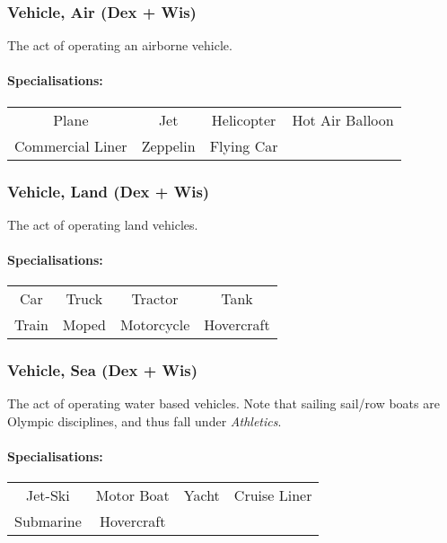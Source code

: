 \subsubsection{Vehicle, Air (Dex + Wis)}
The act of operating an airborne vehicle.

\paragraph{Specialisations:}
\begin{center}
    \begin{tabular}{c|c|c|c}
        Plane & Jet & Helicopter & Hot Air Balloon \\
        Commercial Liner & Zeppelin & Flying Car \\
    \end{tabular}
\end{center}

\subsubsection{Vehicle, Land (Dex + Wis)}
The act of operating land vehicles.

\paragraph{Specialisations:}
\begin{center}
    \begin{tabular}{c|c|c|c}
        Car & Truck & Tractor & Tank \\
        Train & Moped & Motorcycle & Hovercraft
    \end{tabular}
\end{center}

\subsubsection{Vehicle, Sea (Dex + Wis)}
The act of operating water based vehicles.
Note that sailing sail/row boats are Olympic disciplines, and thus fall under \textit{Athletics}.

\paragraph{Specialisations:}
\begin{center}
    \begin{tabular}{c|c|c|c}
        Jet-Ski & Motor Boat & Yacht & Cruise Liner \\
        Submarine & Hovercraft & 
    \end{tabular}
\end{center}

